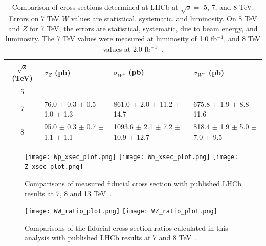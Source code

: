 \documentclass[a4paper]{article}
\begin{document}
\begin{table}[]
    \centering
    \begin{tabular}{c|lll}
        \hline
        \small $\sqrt{s}$ (TeV)   & \small $\sigma_{Z}$ (pb) & \small $\sigma_{W^+}$ (pb) & \small $\sigma_{W^-}$ (pb)  \\
        \hline
         5              & \small   & \small  & \small \\
         7              & \small 76.0 $\pm$ 0.3 $\pm$ 0.5 $\pm$ 1.0 $\pm$ 1.3 & \small 861.0 $\pm$ 2.0 $\pm$ 11.2 $\pm$ 14.7 & \small 675.8 $\pm$ 1.9 $\pm$ 8.8 $\pm$ 11.6\\
         8              & \small 95.0 $\pm$ 0.3 $\pm$ 0.7 $\pm$ 1.1 $\pm$ 1.1 & \small 1093.6 $\pm$ 2.1 $\pm$ 7.2 $\pm$ 10.9 $\pm$ 12.7 & \small 818.4 $\pm$ 1.9 $\pm$ 5.0 $\pm$ 7.0 $\pm$ 9.5\\
         \hline
    \end{tabular}
    \caption{\small Comparison of cross sections determined at LHCb at $\sqrt{s} =$ 5, 7, and 8 TeV. Errors on 7 TeV $W$ values are statistical, systematic, and luminosity. On 8 TeV and $Z$ for 7 TeV, the errors are statistical, systematic, due to beam energy, and luminosity. The 7 TeV values were measured at luminosity of 1.0 fb$^{-1}$, and 8 TeV values at 2.0 fb$^{-1}$~\cite{7TeV_W_2014,7TeV_Z_2015,8TeV_W+Z_2015}.}
    \label{tab: xsec comparison}
\end{table}

\begin{figure}[t]
\centering
\texttt{[image: Wp\_xsec\_plot.png]}
\texttt{[image: Wm\_xsec\_plot.png]}
\texttt{[image: Z\_xsec\_plot.png]}
\vspace{-4mm}
\caption{\small Comparisons of measured fiducial cross section with published LHCb results at 7, 8 and 13 TeV~\cite{7TeV_W_2014,7TeV_Z_2015,8TeV_W+Z_2015,13TeV_Z_2016}.}
\label{fig: xsec comparison}
\end{figure}

\begin{figure}[t]
\centering
\texttt{[image: WW\_ratio\_plot.png]}
\texttt{[image: WZ\_ratio\_plot.png]} %
\vspace{-4mm}
\caption{\small Comparisons of the fiducial cross section ratios calculated in this analysis with published LHCb results at 7 and 8 TeV~\cite{7TeV_Z_2015,8TeV_W+Z_2015}.}
\label{fig: ratio comparison}
\end{figure}
\end{document}
